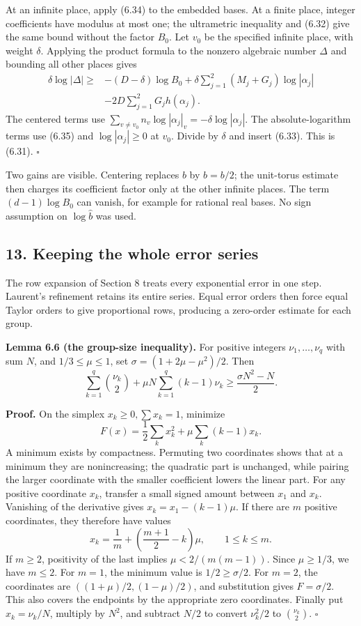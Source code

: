 \documentclass[
  11pt,
  a4paper,
]{article}
\begin{document}
At an infinite place, apply (6.34) to the embedded bases. At a finite
place, integer coefficients have modulus at most one; the ultrametric
inequality and (6.32) give the same bound without the factor \(B_0\).
Let \(v_0\) be the specified infinite place, with weight \(\delta\).
Applying the product formula to the nonzero algebraic number \(\Delta\)
and bounding all other places gives \[
\begin{aligned}
\delta\log|\Delta|\ge{}&-(D-\delta)\log B_0
 +\delta\sum_{j=1}^{2}(M_j+G_j)\log|\alpha_j|\\
&-2D\sum_{j=1}^{2}G_jh(\alpha_j).
\end{aligned}
\tag{6.36}
\] The centered terms use
\(\sum_{v\ne v_0}n_v\log|\alpha_j|_v=-\delta\log|\alpha_j|\). The
absolute-logarithm terms use (6.35) and \(\log|\alpha_j|\ge0\) at
\(v_0\). Divide by \(\delta\) and insert (6.33). This is (6.31).
\(\square\)

Two gains are visible. Centering replaces \(b\) by \(\widehat b=b/2\);
the unit-torus estimate then charges its coefficient factor only at the
other infinite places. The term \((d-1)\log B_0\) can vanish, for
example for rational real bases. No sign assumption on
\(\log\widehat b\) was used.

\subsection{13. Keeping the whole error
series}\label{keeping-the-whole-error-series}

The row expansion of Section 8 treats every exponential error in one
step. Laurent's refinement retains its entire series. Equal error orders
then force equal Taylor orders to give proportional rows, producing a
zero-order estimate for each group.

\textbf{Lemma 6.6 (the group-size inequality).} For positive integers
\(\nu_1,\ldots,\nu_q\) with sum \(N\), and \(1/3\le\mu\le1\), set
\(\sigma=(1+2\mu-\mu^2)/2\). Then \[
\sum_{k=1}^{q}\binom{\nu_k}{2}
+\mu N\sum_{k=1}^{q}(k-1)\nu_k
\ge\frac{\sigma N^2-N}{2}.
\tag{6.37}
\]

\textbf{Proof.} On the simplex \(x_k\ge0,\sum x_k=1\), minimize \[
F(x)=\frac12\sum_kx_k^2+\mu\sum_k(k-1)x_k.
\] A minimum exists by compactness. Permuting two coordinates shows that
at a minimum they are nonincreasing; the quadratic part is unchanged,
while pairing the larger coordinate with the smaller coefficient lowers
the linear part. For any positive coordinate \(x_k\), transfer a small
signed amount between \(x_1\) and \(x_k\). Vanishing of the derivative
gives \(x_k=x_1-(k-1)\mu\). If there are \(m\) positive coordinates,
they therefore have values \[
x_k=\frac1m+\left(\frac{m+1}{2}-k\right)\mu,
\qquad 1\le k\le m.
\] If \(m\ge2\), positivity of the last implies \(\mu<2/(m(m-1))\).
Since \(\mu\ge1/3\), we have \(m\le2\). For \(m=1\), the minimum value
is \(1/2\ge\sigma/2\). For \(m=2\), the coordinates are
\(((1+\mu)/2,(1-\mu)/2)\), and substitution gives \(F=\sigma/2\). This
also covers the endpoints by the appropriate zero coordinates. Finally
put \(x_k=\nu_k/N\), multiply by \(N^2\), and subtract \(N/2\) to
convert \(\nu_k^2/2\) to \(\binom{\nu_k}{2}\). \(\square\)
\end{document}

